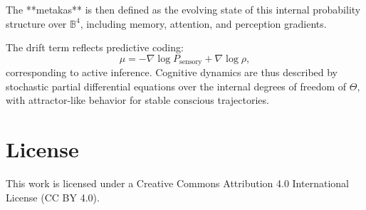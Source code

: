\documentclass[12pt]{article}
\begin{document}
The **metakas** is then defined as the evolving state of this internal probability structure over \( \mathbb{B}^4 \), including memory, attention, and perception gradients.

The drift term reflects predictive coding:
\[
\mu = -\nabla \log P_\text{sensory} + \nabla \log \rho,
\]
corresponding to active inference. Cognitive dynamics are thus described by stochastic partial differential equations over the internal degrees of freedom of \( \Theta \), with attractor-like behavior for stable conscious trajectories.

\section*{License}
This work is licensed under a Creative Commons Attribution 4.0 International License (CC BY 4.0).
\end{document}
